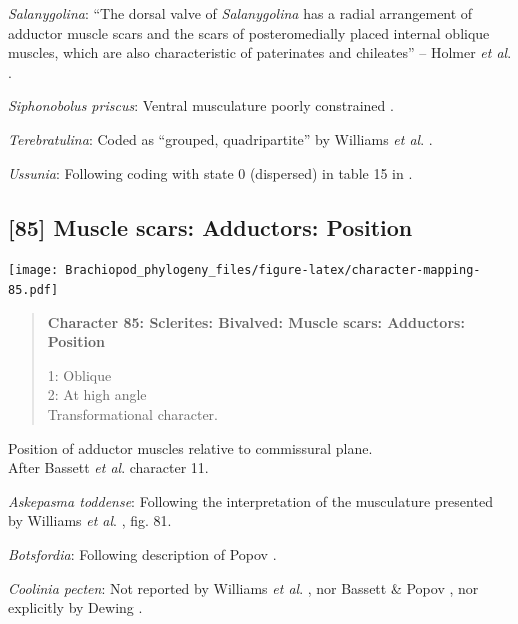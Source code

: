 \documentclass[openany]{book}
\begin{document}
\hypertarget{Salanygolina-coding-84}{}
\emph{Salanygolina}: ``The dorsal valve of \emph{Salanygolina} has a
radial arrangement of adductor muscle scars and the scars of
posteromedially placed internal oblique muscles, which are also
characteristic of paterinates and chileates'' -- Holmer \emph{et al}.
\citeyearpar{Holmer2009Theenigmatic}.

\hypertarget{Siphonobolus_priscus-coding-84}{}
\emph{Siphonobolus priscus}: Ventral musculature poorly constrained
\citep{Williams2000LinguliformeaCraniiformea, Popov2009Earlyontogeny}.

\hypertarget{Terebratulina-coding-84}{}
\emph{Terebratulina}: Coded as ``grouped, quadripartite'' by Williams
\emph{et al}. \citeyearpar{Williams1996Asupra}.

\hypertarget{Ussunia-coding-84}{}
\emph{Ussunia}: Following coding with state 0 (dispersed) in table 15 in
\citet{Williams2000LinguliformeaCraniiformea}.

\subsection*{{[}85{]} Muscle scars: Adductors:
Position}\label{muscle-scars-adductors-position}

\texttt{[image: Brachiopod\_phylogeny\_files/figure-latex/character-mapping-85.pdf]}

\begin{quote}
\textbf{Character 85: Sclerites: Bivalved: Muscle scars: Adductors:
Position}

1: Oblique\\
2: At high angle\\
Transformational character.
\end{quote}

Position of adductor muscles relative to commissural plane.\\
After Bassett \emph{et al}.
\citeyearpar{Bassett2001Functionalmorphology} character 11.

\hypertarget{Askepasma_toddense-coding-85}{}
\emph{Askepasma toddense}: Following the interpretation of the
musculature presented by Williams \emph{et al}.
\citeyearpar{Williams2000LinguliformeaCraniiformea}, fig. 81.

\hypertarget{Botsfordia-coding-85}{}
\emph{Botsfordia}: Following description of Popov
\citeyearpar{Popov1992TheCambrian}.

\hypertarget{Coolinia_pecten-coding-85}{}
\emph{Coolinia pecten}: Not reported by Williams \emph{et al}.
\citeyearpar{Williams2000LinguliformeaCraniiformea}, nor Bassett \&
Popov \citeyearpar{Bassett2017Earliestontogeny}, nor explicitly by
Dewing \citeyearpar{Dewing2001Hingemodifications}.
\end{document}
